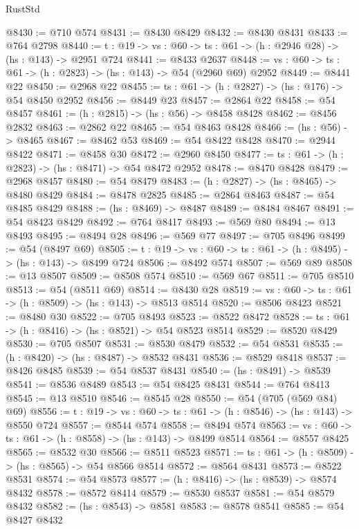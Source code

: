\begin{lexlean}{RustStd}
\begin{coremodule}
@8430 := @710 @574
@8431 := @8430 @8429
@8432 := @8430 @8431
@8433 := @764 @2798
@8440 := {t : @19} -> {vs : @60} -> {ts : @61} -> (h : @2946 @28) -> (hs : @143) -> @2951 @724
@8441 := @8433 @2637
@8448 := {vs : @60} -> {ts : @61} -> (h : @2823) -> (hs : @143) -> @54 (@2960 @69) @2952
@8449 := @8441 @22
@8450 := @2968 @22
@8455 := {ts : @61} -> (h : @2827) -> (hs : @176) -> @54 @8450 @2952
@8456 := @8449 @23
@8457 := @2864 @22
@8458 := @54 @8457
@8461 := (h : @2815) -> (hs : @56) -> @8458 @8428
@8462 := @8456 @2832
@8463 := @2862 @22
@8465 := @54 @8463 @8428
@8466 := (hs : @56) -> @8465
@8467 := @8462 @53
@8469 := @54 @8422 @8428
@8470 := @2944 @8422
@8471 := @8458 @30
@8472 := @2960 @8450
@8477 := {ts : @61} -> (h : @2823) -> (hs : @8471) -> @54 @8472 @2952
@8478 := @8470 @8428
@8479 := @2968 @8457
@8480 := @54 @8479
@8483 := (h : @2827) -> (hs : @8465) -> @8480 @8429
@8484 := @8478 @2825
@8485 := @2864 @8463
@8487 := @54 @8485 @8429
@8488 := (hs : @8469) -> @8487
@8489 := @8484 @8467
@8491 := @54 @8423 @8429
@8492 := @764 @8417
@8493 := @569 @80
@8494 := @13 @8493
@8495 := @8494 @28
@8496 := @569 @77
@8497 := @705 @8496
@8499 := @54 (@8497 @69)
@8505 := {t : @19} -> {vs : @60} -> {ts : @61} -> (h : @8495) -> (hs : @143) -> @8499 @724
@8506 := @8492 @574
@8507 := @569 @89
@8508 := @13 @8507
@8509 := @8508 @574
@8510 := @569 @67
@8511 := @705 @8510
@8513 := @54 (@8511 @69)
@8514 := @8430 @28
@8519 := {vs : @60} -> {ts : @61} -> (h : @8509) -> (hs : @143) -> @8513 @8514
@8520 := @8506 @8423
@8521 := @8480 @30
@8522 := @705 @8493
@8523 := @8522 @8472
@8528 := {ts : @61} -> (h : @8416) -> (hs : @8521) -> @54 @8523 @8514
@8529 := @8520 @8429
@8530 := @705 @8507
@8531 := @8530 @8479
@8532 := @54 @8531
@8535 := (h : @8420) -> (hs : @8487) -> @8532 @8431
@8536 := @8529 @8418
@8537 := @8426 @8485
@8539 := @54 @8537 @8431
@8540 := (hs : @8491) -> @8539
@8541 := @8536 @8489
@8543 := @54 @8425 @8431
@8544 := @764 @8413
@8545 := @13 @8510
@8546 := @8545 @28
@8550 := @54 (@705 (@569 @84) @69)
@8556 := {t : @19} -> {vs : @60} -> {ts : @61} -> (h : @8546) -> (hs : @143) -> @8550 @724
@8557 := @8544 @574
@8558 := @8494 @574
@8563 := {vs : @60} -> {ts : @61} -> (h : @8558) -> (hs : @143) -> @8499 @8514
@8564 := @8557 @8425
@8565 := @8532 @30
@8566 := @8511 @8523
@8571 := {ts : @61} -> (h : @8509) -> (hs : @8565) -> @54 @8566 @8514
@8572 := @8564 @8431
@8573 := @8522 @8531
@8574 := @54 @8573
@8577 := (h : @8416) -> (hs : @8539) -> @8574 @8432
@8578 := @8572 @8414
@8579 := @8530 @8537
@8581 := @54 @8579 @8432
@8582 := (hs : @8543) -> @8581
@8583 := @8578 @8541
@8585 := @54 @8427 @8432

\end{coremodule}
\end{lexlean}
